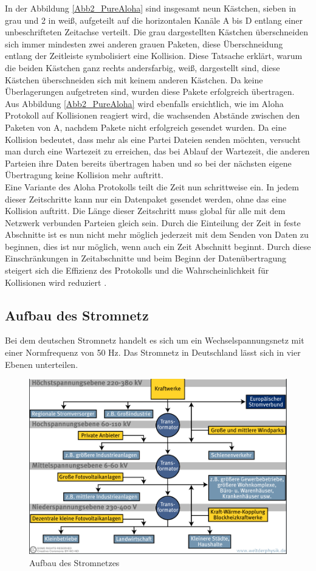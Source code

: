 In der Abbildung \ref{Abb2_PureAloha} sind insgesamt neun Kästchen, sieben in grau und 2 in weiß, aufgeteilt auf die horizontalen Kanäle A bis D entlang einer unbeschrifteten Zeitachse verteilt. Die grau dargestellten Kästchen überschneiden sich immer mindesten zwei anderen grauen Paketen, diese Überschneidung entlang der Zeitleiste symbolisiert eine Kollision. Diese Tatsache erklärt, warum die beiden Kästchen ganz rechts andersfarbig, weiß, dargestellt sind, diese Kästchen überschneiden sich mit keinem anderen Kästchen. Da keine Überlagerungen aufgetreten sind, wurden diese Pakete erfolgreich übertragen. Aus Abbildung \ref{Abb2_PureAloha} wird ebenfalls ersichtlich, wie im Aloha Protokoll auf Kollisionen reagiert wird, die wachsenden Abstände zwischen den Paketen von A, nachdem Pakete nicht erfolgreich gesendet wurden. Da eine Kollision bedeutet, dass mehr als eine Partei Dateien senden möchten, versucht man durch eine Wartezeit zu erreichen, das bei Ablauf der Wartezeit, die anderen Parteien ihre Daten bereits übertragen haben und so bei der nächsten eigene Übertragung keine Kollision mehr auftritt.\\
Eine Variante des Aloha Protokolls teilt die Zeit nun schrittweise ein. In jedem dieser Zeitschritte kann nur ein Datenpaket gesendet werden, ohne das eine Kollision auftritt. Die Länge dieser Zeitschritt muss global für alle mit dem Netzwerk verbunden Parteien gleich sein. Durch die Einteilung der Zeit in feste Abschnitte ist es nun nicht mehr möglich jederzeit mit dem Senden von Daten zu beginnen, dies ist nur möglich, wenn auch ein Zeit Abschnitt beginnt. Durch diese Einschränkungen in Zeitabschnitte und beim Beginn der Datenübertragung steigert sich die Effizienz des Protokolls und die Wahrscheinlichkeit für Kollisionen wird reduziert \cite{Back_AlohaPure}.

\subsection{Aufbau des Stromnetz}
Bei dem deutschen Stromnetz handelt es sich um ein Wechselspannungsnetz mit einer Normfrequenz von 50 Hz. Das Stromnetz in Deutschland lässt sich in vier Ebenen unterteilen.
\begin{figure}[h!]
	\includegraphics[width=\linewidth]{img/Stromnetz1.png}
	\caption{Aufbau des Stromnetzes}
	\label{Abb1_Stromnetz}
\end{figure}


